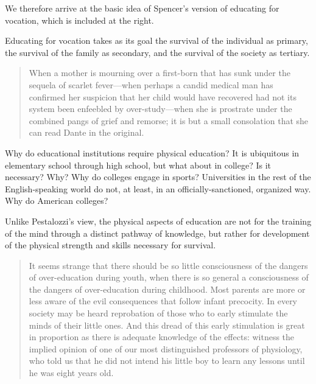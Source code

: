 We therefore arrive at the basic idea of Spencer's version of educating for vocation, which is included at the right.
\begin{purpose}\label{def:forvocation-spencer}
Educating for vocation takes as its goal the survival of the individual as primary, the survival of the family as secondary, and the survival of the society as tertiary.
\end{purpose} 

\begin{quote}

When a mother is mourning over a first-born that has sunk under the sequela of scarlet fever---when perhaps a candid medical man has confirmed her suspicion that her child would have recovered had not its system been enfeebled by over-study---when she is prostrate under the combined pangs of grief and remorse; it is but a small consolation that she can read Dante in the original. ~\citep[p. 63]{Spencer:1861ts}
\end{quote}

\begin{question}Why do educational institutions require physical education?  It is ubiquitous in elementary school through high school, but what about in college?  Is it necessary? Why? Why do colleges engage in sports? Universities in the rest of the English-speaking world do not, at least, in an officially-sanctioned, organized way.  Why do American colleges?\end{question}Unlike Pestalozzi's view, the physical aspects of education are not for the training of the mind through a distinct pathway of knowledge, but rather for development of the physical strength and skills necessary for survival.

\begin{quote}

It seems strange that there should be so little consciousness of the dangers of over-education during youth, when there is so general a consciousness of the dangers of over-education during childhood. Most parents are more or less aware of the evil consequences that follow infant precocity. In every society may be heard reprobation of those who to early stimulate the minds of their little ones. And this dread of this early stimulation is great in proportion as there is adequate knowledge of the effects: witness the implied opinion of one of our most distinguished professors of physiology, who told us that he did not intend his little boy to learn any lessons until he was eight years old. ~\citep[p. 284]{Spencer:1861ts}
\end{quote}

